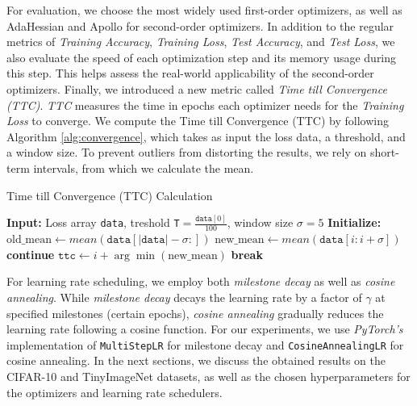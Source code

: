 For evaluation, we choose the most widely used first-order optimizers, as well as AdaHessian and Apollo for second-order
optimizers. In addition to the regular metrics of \emph{Training Accuracy}, \emph{Training Loss},
\emph{Test Accuracy}, and \emph{Test Loss}, we also evaluate the speed of each optimization step and 
its memory usage during this step. This helps assess the real-world applicability of the second-order optimizers.
Finally, we introduced a new metric called \emph{Time till Convergence (TTC)}.
\emph{TTC} measures the time in epochs each optimizer needs for the \emph{Training Loss} to converge.
We compute the Time till Convergence (TTC) by following Algorithm \ref{alg:convergence},
which takes as input the loss data, a threshold, and a window size.
To prevent outliers from distorting the results, we rely on short-term intervals, from which we calculate the mean.
\begin{algorithm}
    \caption{Time till Convergence (TTC) Calculation}
    \label{alg:convergence}

    \begin{algorithmic}[1]
    \State \textbf{Input:} Loss array \texttt{data}, treshold \texttt{T}$=\frac{\texttt{data}[0]}{100}$, window size $\sigma=5$
    \State \textbf{Initialize:} $ \text{old\_mean} \gets mean(\texttt{data}[ \lvert \texttt{data}\rvert -\sigma :] )$ 
    \State $ \text{new\_mean} \gets  mean(\texttt{data}[i:i+\sigma]) $
            \State \textbf{continue}
        \Else
            \State $\texttt{ttc} \gets i + \arg\min (\text{new\_mean})$
            \State \textbf{break}
        \EndIf
    \EndFor
    \end{algorithmic}
    \end{algorithm}
For learning rate scheduling, we employ both \emph{milestone decay} as well as \emph{cosine annealing}.
While \emph{milestone decay} decays the learning rate by a factor of $\gamma$ at
specified milestones (certain epochs), \emph{cosine annealing} gradually reduces the learning rate
following a cosine function.
For our experiments, we use \emph{PyTorch's} implementation of \texttt{MultiStepLR} for milestone decay and
\texttt{CosineAnnealingLR} for cosine annealing.
In the next sections, we discuss the obtained results on the CIFAR-10 and TinyImageNet
datasets, as well as the chosen hyperparameters for the optimizers and learning rate schedulers.

